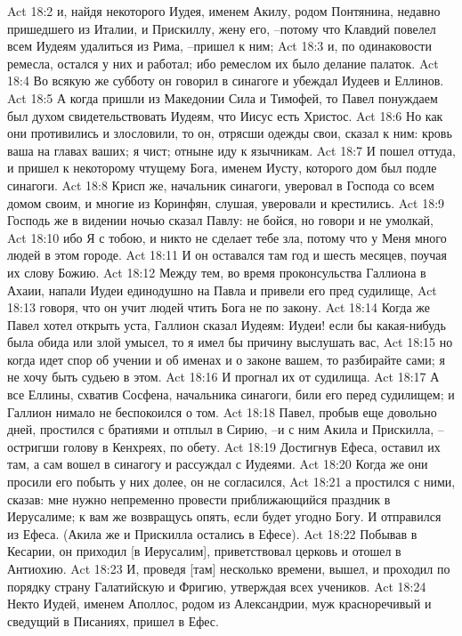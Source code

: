 Act 18:2  и, найдя некоторого Иудея, именем Акилу, родом Понтянина, недавно пришедшего из Италии, и Прискиллу, жену его, --потому что Клавдий повелел всем Иудеям удалиться из Рима, --пришел к ним;
Act 18:3  и, по одинаковости ремесла, остался у них и работал; ибо ремеслом их было делание палаток.
Act 18:4  Во всякую же субботу он говорил в синагоге и убеждал Иудеев и Еллинов.
Act 18:5  А когда пришли из Македонии Сила и Тимофей, то Павел понуждаем был духом свидетельствовать Иудеям, что Иисус есть Христос.
Act 18:6  Но как они противились и злословили, то он, отрясши одежды свои, сказал к ним: кровь ваша на главах ваших; я чист; отныне иду к язычникам.
Act 18:7  И пошел оттуда, и пришел к некоторому чтущему Бога, именем Иусту, которого дом был подле синагоги.
Act 18:8  Крисп же, начальник синагоги, уверовал в Господа со всем домом своим, и многие из Коринфян, слушая, уверовали и крестились.
Act 18:9  Господь же в видении ночью сказал Павлу: не бойся, но говори и не умолкай,
Act 18:10  ибо Я с тобою, и никто не сделает тебе зла, потому что у Меня много людей в этом городе.
Act 18:11  И он оставался там год и шесть месяцев, поучая их слову Божию.
Act 18:12  Между тем, во время проконсульства Галлиона в Ахаии, напали Иудеи единодушно на Павла и привели его пред судилище,
Act 18:13  говоря, что он учит людей чтить Бога не по закону.
Act 18:14  Когда же Павел хотел открыть уста, Галлион сказал Иудеям: Иудеи! если бы какая-нибудь была обида или злой умысел, то я имел бы причину выслушать вас,
Act 18:15  но когда идет спор об учении и об именах и о законе вашем, то разбирайте сами; я не хочу быть судьею в этом.
Act 18:16  И прогнал их от судилища.
Act 18:17  А все Еллины, схватив Сосфена, начальника синагоги, били его перед судилищем; и Галлион нимало не беспокоился о том.
Act 18:18  Павел, пробыв еще довольно дней, простился с братиями и отплыл в Сирию, --и с ним Акила и Прискилла, --остригши голову в Кенхреях, по обету.
Act 18:19  Достигнув Ефеса, оставил их там, а сам вошел в синагогу и рассуждал с Иудеями.
Act 18:20  Когда же они просили его побыть у них долее, он не согласился,
Act 18:21  а простился с ними, сказав: мне нужно непременно провести приближающийся праздник в Иерусалиме; к вам же возвращусь опять, если будет угодно Богу. И отправился из Ефеса. (Акила же и Прискилла остались в Ефесе).
Act 18:22  Побывав в Кесарии, он приходил [в Иерусалим], приветствовал церковь и отошел в Антиохию.
Act 18:23  И, проведя [там] несколько времени, вышел, и проходил по порядку страну Галатийскую и Фригию, утверждая всех учеников.
Act 18:24  Некто Иудей, именем Аполлос, родом из Александрии, муж красноречивый и сведущий в Писаниях, пришел в Ефес.
